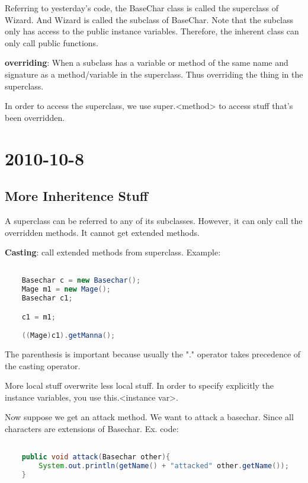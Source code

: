 \documentclass [12 pt, twoside] {article}
\begin{document}
Referring to yesterday's code, the BaseChar class is called
the superclass of Wizard. And Wizard is called the
subclass of BaseChar. Note that the subclass only has access
to the public instance variables. Therefore, the inherent class
can only call public functions.


\textbf{overriding}: When a subclass has a variable or method of the same name 
and signature as a method/variable in the superclass. Thus overriding
the thing in the superclass.


In order to access the superclass, we use super.<method> to access
stuff that's been overridden.


\section{2010-10-8}
\subsection{More Inheritence Stuff}


A superclass can be referred to any of its subclasses. However, it can
only call the overridden methods. It cannot get extended methods.


\textbf{Casting}: call extended methods from superclass. Example:
\begin{lstlisting}[language=java]

	Basechar c = new Basechar();
	Mage m1 = new Mage();
	Basechar c1;

	c1 = m1;

	((Mage)c1).getManna();

\end{lstlisting}


The parenthesis is important because usually the "." operator takes precedence of the
casting operator.


More local stuff overwrite less local stuff. In order to specify
explicitly the instance variables, you use this.<instance var>.


Now suppose we get an attack method. We want
to attack a basechar. Since all characters are
extensions of Basechar. Ex. code:

\begin{lstlisting}[language=java]

	public void attack(Basechar other){
		System.out.println(getName() + "attacked" other.getName());
	}

\end{lstlisting}
\end{document}
